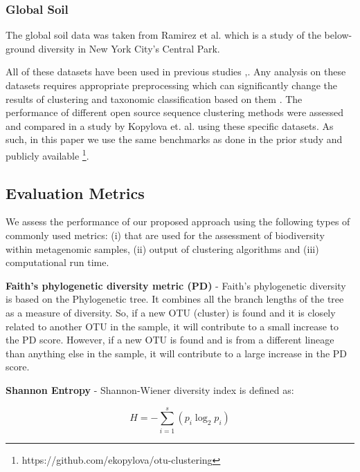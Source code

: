 \documentclass[10pt, conference, compsocconf]{IEEEtran}
\begin{document}
\subsubsection{Global Soil}
The global soil data was taken from Ramirez et al. \cite{MARglobalSoil} which is a study of the below-ground diversity in New York City's Central Park. 

All of these datasets have been used in 
previous studies \cite{MARmockDatasetRef},\cite{MARopenDeNovo}. Any 
analysis on these datasets requires 
appropriate preprocessing which can significantly change the 
results of clustering and taxonomic classification 
based on them \cite{MARmockDatasetRef}. The performance of 
different open source sequence clustering methods were 
assessed and compared in a  study by Kopylova et. al. \cite{MARopenDeNovo} using 
these specific datasets. As such, in this paper we use the same 
benchmarks as done in the prior study and publicly available \footnote{https://github.com/ekopylova/otu-clustering}.


\subsection{Evaluation Metrics}

We assess the performance of our proposed approach using 
the following types of  commonly used metrics: (i) that are used 
for the assessment of biodiversity
within metagenomic samples, (ii) output of clustering algorithms 
and (iii) computational run time. 

\hspace*{4mm}\textbf{Faith’s phylogenetic diversity metric (PD)} - Faith’s phylogenetic 
diversity \cite{MARfaith1992conservation} is based on the Phylogenetic tree. It combines all 
the branch lengths of the tree as a measure of diversity. So, if a new 
OTU (cluster)  is found and it is closely related to another OTU in the sample, it will contribute to 
a small increase to the PD score. However, if a new OTU is found and is 
from a different lineage than anything else in the sample, it will contribute to a large 
increase in the PD score. %

\hspace*{4mm}\textbf{Shannon Entropy} - Shannon-Wiener diversity index is defined as:

\begin{equation}
H={-} \sum_{i=1}^{s} \left( p_i\log_2p_i \right)
\end{equation}
\end{document}

